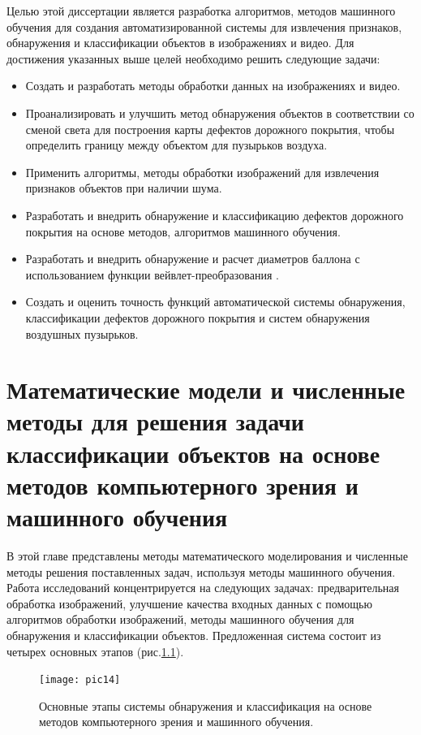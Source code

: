 \documentclass[a4paper,14pt]{extreport}
\begin{document}
Целью этой диссертации является разработка алгоритмов, методов машинного обучения для создания автоматизированной системы для извлечения признаков, обнаружения и классификации объектов в изображениях и видео. Для достижения указанных выше целей необходимо решить следующие задачи:

\begin{itemize}
	\item Создать и разработать методы обработки данных на изображениях и видео.
\item	Проанализировать и улучшить метод обнаружения объектов в соответствии со сменой света для построения карты дефектов дорожного покрытия, чтобы определить границу между объектом для пузырьков воздуха.
\item	Применить алгоритмы, методы обработки изображений для извлечения признаков объектов при наличии шума.
\item	Разработать и внедрить обнаружение и классификацию дефектов дорожного покрытия на основе методов, алгоритмов машинного обучения.
\item	Разработать и внедрить обнаружение и расчет диаметров баллона с использованием функции вейвлет-преобразования .
\item	Создать и оценить точность функций автоматической системы обнаружения, классификации дефектов дорожного покрытия и систем обнаружения воздушных пузырьков.

\end{itemize}

\chapter{Математические модели и численные методы для решения задачи классификации объектов на основе методов компьютерного зрения и машинного обучения} \label{chapt2}
В этой главе представлены методы математического моделирования и численные методы решения поставленных задач, используя методы машинного обучения. Работа исследований концентрируется на следующих задачах: предварительная обработка изображений, улучшение качества входных данных с помощью алгоритмов обработки изображений, методы машинного обучения для обнаружения и классификации объектов. Предложенная система состоит из четырех основных этапов (рис.\ref{pic14}).
\begin{figure}[ht!]
\centering
\texttt{[image: pic14]}
\caption{Основные этапы системы обнаружения и классификация на основе методов компьютерного зрения и машинного обучения.}
	\label{pic14}
	\end{figure}
\end{document}
